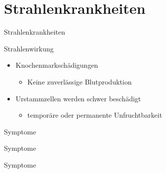 \section{Strahlenkrankheiten}
\begin{frame}
	\begin{block}{Strahlenkrankheiten}
	\end{block}
\end{frame}
\begin{frame}{Strahlenwirkung}
	\begin{itemize}
		\item Knochenmarkschädigungen
		\begin{itemize}
			\item[\Rightarrow] Keine zuverlässige Blutproduktion
		\end{itemize}
		\item Urstammzellen werden schwer beschädigt
		\begin{itemize}
			\item[\Rightarrow] temporäre oder permanente Unfruchtbarkeit
		\end{itemize}
	\end{itemize}
\end{frame}
\begin{frame}{Symptome}
	
\end{frame}
\begin{frame}{Symptome}
	
\end{frame}
\begin{frame}{Symptome}
	
\end{frame}
